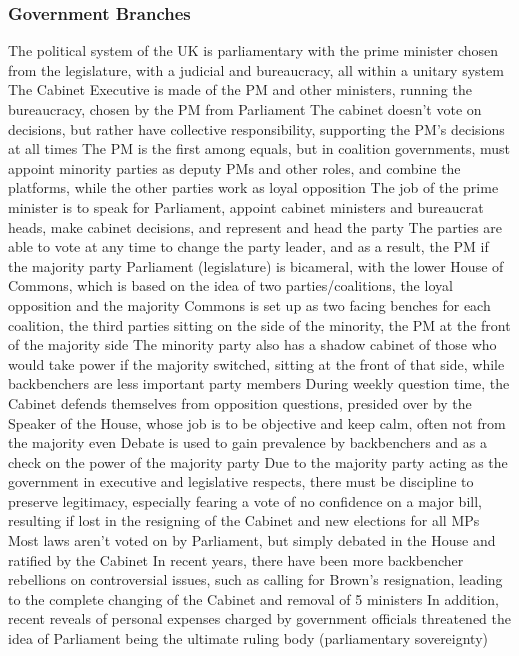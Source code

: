 \documentclass[11 pt, twoside]{article}
\newenvironment{outline*}
{
	\begin{outline}[enumerate]
	}
	{\end{outline}
}
\begin{document}
\subsubsection{Government Branches}
\begin{outline*}
\1 The political system of the UK is parliamentary with the prime minister chosen from the legislature, with a judicial and bureaucracy, all within a unitary system
\1 The Cabinet Executive is made of the PM and other ministers, running the bureaucracy, chosen by the PM from Parliament
\2 The cabinet doesn't vote on decisions, but rather have collective responsibility, supporting the PM's decisions at all times
\2 The PM is the first among equals, but in coalition governments, must appoint minority parties as deputy PMs and other roles, and combine the platforms, while the other parties work as loyal opposition
\2 The job of the prime minister is to speak for Parliament, appoint cabinet ministers and bureaucrat heads, make cabinet decisions, and represent and head the party
\2 The parties are able to vote at any time to change the party leader, and as a result, the PM if the majority party
\1 Parliament (legislature) is bicameral, with the lower House of Commons, which is based on the idea of two parties/coalitions, the loyal opposition and the majority
\2 Commons is set up as two facing benches for each coalition, the third parties sitting on the side of the minority, the PM at the front of the majority side
\3 The minority party also has a shadow cabinet of those who would take power if the majority switched, sitting at the front of that side, while backbenchers are less important party members
\3 During weekly question time, the Cabinet defends themselves from opposition questions, presided over by the Speaker of the House, whose job is to be objective and keep calm, often not from the majority even
\3 Debate is used to gain prevalence by backbenchers and as a check on the power of the majority party
\3 Due to the majority party acting as the government in executive and legislative respects, there must be discipline to preserve legitimacy, especially fearing a vote of no confidence on a major bill, resulting if lost in the resigning of the Cabinet and new elections for all MPs
\4 Most laws aren't voted on by Parliament, but simply debated in the House and ratified by the Cabinet
\4 In recent years, there have been more backbencher rebellions on controversial issues, such as calling for Brown's resignation, leading to the complete changing of the Cabinet and removal of 5 ministers
\4 In addition, recent reveals of personal expenses charged by government officials threatened the idea of Parliament being the ultimate ruling body (parliamentary sovereignty)

\end{outline*}
\end{document}
